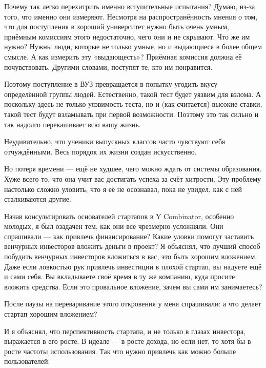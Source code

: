 \documentclass[ebook,12pt,oneside,openany]{memoir}
\begin{document}
Почему так легко перехитрить именно вступительные испытания? Думаю,
из-за того, что именно они измеряют. Несмотря на распространённость
мнения о том, что для поступления в хороший университет нужно быть
очень умным, приёмным комиссиям этого недостаточно, чего они и не
скрывают. Что же им нужно? Нужны люди, которые не только умные, но и
выдающиеся в более общем смысле. А как измерить эту «выдающесть»?
Приёмная комиссия должна её почувствовать. Другими словами, поступят
те, кто им понравится. \newline

Поэтому поступление в ВУЗ превращается в попытку угодить вкусу
определённой группы людей. Естественно, такой тест будет уязвим для
взлома. А поскольку здесь не только уязвимость теста, но и (как
считается) высокие ставки, такой тест будут взламывать при первой
возможности. Поэтому это так сильно и так надолго перекашивает всю
вашу жизнь. \newline

Неудивительно, что ученики выпускных классов часто чувствуют себя
отчуждёнными. Весь порядок их жизни создан искусственно. \newline

Но потеря времени — ещё не худшее, чего можно ждать от системы
образования. Хуже всего то, что она учит вас достигать успеха за счёт
хитрости. Эту проблему настолько сложно уловить, что я её не
осознавал, пока не увидел, как с ней сталкиваются другие. \newline

Начав консультировать основателей стартапов в Y Combinator, особенно
молодых, я был озадачен тем, как они всё чрезмерно усложняли. Они
спрашивали — как привлечь финансирование? Какие уловки помогут
заставить венчурных инвесторов вложить деньги в проект? Я объяснял,
что лучший способ побудить венчурных инвесторов вложиться в вас, это
быть хорошим вложением. Даже если ловкостью рук привлечь инвестиции в
плохой стартап, вы надуете ещё и сами себя. Вы вкладываете своё время
в ту же компанию, куда просите вложить средства. Если это провальное
вложение, зачем вы сами им занимаетесь? \newline

После паузы на переваривание этого откровения у меня спрашивали: а что
делает стартап хорошим вложением? \newline

И я объяснял, что перспективность стартапа, и не только в глазах
инвестора, выражается в его росте. В идеале — в росте дохода, но если
нет, то хотя бы в росте частоты использования. Так что нужно привлечь
как можно больше пользователей. \newline
\end{document}

